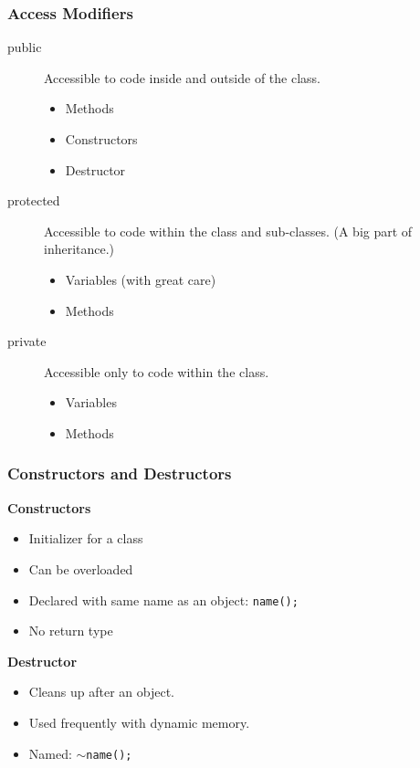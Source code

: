 \documentclass[handout]{beamer}
\begin{document}
\begin{frame}
   \frametitle{Access Modifiers}
   \begin{description}
     \item[public] Accessible to code inside and outside of the class.
       \begin{itemize}
       \item<2-> Methods
       \item<2-> Constructors
       \item<2-> Destructor
       \end{itemize}
     \item[protected] Accessible to code within the class and sub-classes.
        (A big part of inheritance.)
        \begin{itemize}
        \item<3-> Variables (with great care)
        \item<3-> Methods
        \end{itemize}
     \item[private] Accessible only to code within the class.
         \begin{itemize}
         \item<4-> Variables
         \item<4-> Methods
         \end{itemize}
   \end{description}
\end{frame}

\begin{frame}[fragile]
   \frametitle{Constructors and Destructors}
   {\bf Constructors}
   \begin{itemize}
     \item Initializer for a class
     \item Can be overloaded
     \item Declared with same name as an object:
       {\tt name();}
     \item No return type
   \end{itemize}
   
   {\bf Destructor}
   \begin{itemize}
     \item Cleans up after an object.
     \item Used frequently with dynamic memory. 
     \item Named: {\tt $\sim$name();}
   \end{itemize}
\end{frame}
\end{document}
